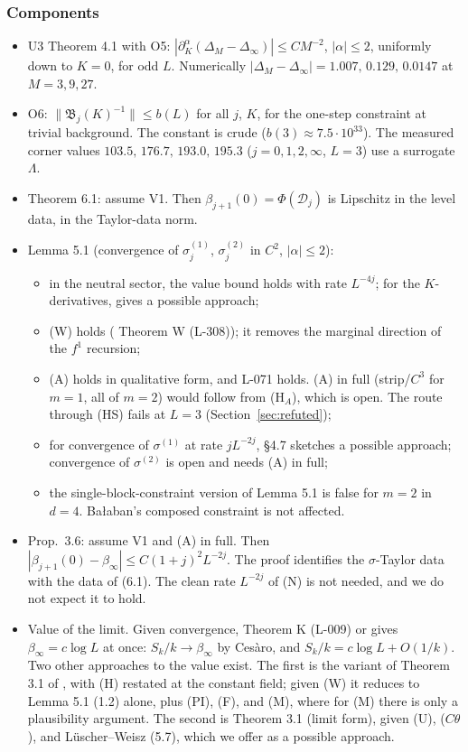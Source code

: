 \subsubsection{Components}
\begin{itemize}
\item U3 Theorem 4.1 with O5: $|\partial_K^\alpha(\Delta_M-\Delta_\infty)|\le CM^{-2}$, $|\alpha|\le2$, uniformly down to $K=0$, for odd $L$. Numerically $|\Delta_M-\Delta_\infty|=1.007,\,0.129,\,0.0147$ at $M=3,9,27$.
\item O6: $\|\mathfrak B_j(K)^{-1}\|\le b(L)$ for all $j$, $K$, for the one-step constraint at trivial background. The constant is crude ($b(3)\approx7.5\cdot10^{33}$). The measured corner values $103.5,\,176.7,\,193.0,\,195.3$ ($j=0,1,2,\infty$, $L=3$) use a surrogate $\Lambda$.
\item Theorem 6.1: assume V1. Then $\beta_{j+1}(0)=\Phi(\mathcal D_j)$ is Lipschitz in the level data, in the Taylor-data norm.
\item Lemma 5.1 (convergence of $\sigma_j^{(1)}$, $\sigma_j^{(2)}$ in $C^2$, $|\alpha|\le2$):
  \begin{itemize}
  \item in the neutral sector, the value bound holds with rate $L^{-4j}$; for the $K$-derivatives,  gives a possible approach;
  \item (W) holds ( Theorem W (L-308)); it removes the marginal direction of the $f^1$ recursion;
  \item (A) holds in qualitative form, and L-071 holds. (A) in full (strip/$C^3$ for $m=1$, all of $m=2$) would follow from (H$_A$), which is open. The route through (HS) fails at $L=3$ (Section~\ref{sec:refuted});
  \item for convergence of $\sigma^{(1)}$ at rate $jL^{-2j}$,  \S4.7 sketches a possible approach; convergence of $\sigma^{(2)}$ is open and needs (A) in full;
  \item the single-block-constraint version of Lemma 5.1 is false for $m=2$ in $d=4$. Ba{\l}aban's composed constraint is not affected.
  \end{itemize}
\item Prop.\ 3.6: assume V1 and (A) in full. Then $|\beta_{j+1}(0)-\beta_\infty|\le C(1+j)^2L^{-2j}$. The proof identifies the $\sigma$-Taylor data with the data of (6.1). The clean rate $L^{-2j}$ of (N) is not needed, and we do not expect it to hold.
\item Value of the limit. Given convergence, Theorem K (L-009) or \ThmPW{} gives $\beta_\infty=c\log L$ at once: $S_k/k\to\beta_\infty$ by Ces\`aro, and $S_k/k=c\log L+O(1/k)$. Two other approaches to the value exist. The first is the variant of Theorem 3.1 of , with (H) restated at the constant field; given (W) it reduces to Lemma 5.1 (1.2) alone, plus (PI), (F), and (M), where for (M) there is only a plausibility argument. The second is  Theorem 3.1 (limit form), given (U), ($C\theta$), and L\"uscher--Weisz (5.7), which we offer as a possible approach.

\end{itemize}
